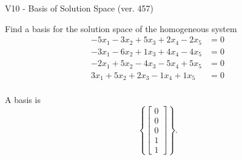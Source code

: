 \begin{exercise}
  \begin{exerciseTitle}V10 - Basis of Solution Space (ver. 457)\end{exerciseTitle}
  \begin{exerciseStatement}
    Find a basis for the solution space of the homogeneous system 
\begin{align*}
 -5 x_ 1 -3 x_ 2 + 5 x_ 3 + 2 x_ 4 -2 x_ 5 &= 0  \\ 
  -3 x_ 1 -6 x_ 2 + 1 x_ 3 + 4 x_ 4 -4 x_ 5 &= 0  \\ 
  -2 x_ 1 + 5 x_ 2 -4 x_ 3 -5 x_ 4 + 5 x_ 5 &= 0  \\ 
  3 x_ 1 + 5 x_ 2 + 2 x_ 3 -1 x_ 4 + 1 x_ 5 &= 0  \\ 
 \end{align*}


 
  \end{exerciseStatement}

  \begin{exerciseAnswer}
   A basis is   
\[\left\{\left[\begin{array}{c}
0 \\
0 \\
0 \\
1 \\
1
\end{array}\right]\right\}.\]

  


  \end{exerciseAnswer}
\end{exercise}